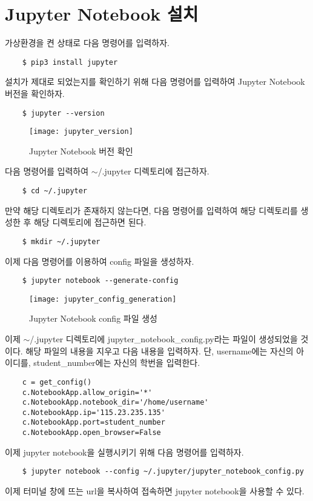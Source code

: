 \section{Jupyter Notebook 설치}
\label{jupyter}
가상환경을 켠 상태로 다음 명령어를 입력하자.
\begin{lstlisting}
    $ pip3 install jupyter
\end{lstlisting}
설치가 제대로 되었는지를 확인하기 위해 다음 명령어를 입력하여 Jupyter Notebook 버전을 확인하자.
\begin{lstlisting}
    $ jupyter --version
\end{lstlisting}

\begin{figure}[H]
	\begin{center}
        \texttt{[image: jupyter\_version]}
        \caption{Jupyter Notebook 버전 확인}
    \end{center}
\end{figure}

다음 명령어를 입력하여 $\sim$/.jupyter 디렉토리에 접근하자.
\begin{lstlisting}
    $ cd ~/.jupyter
\end{lstlisting}
만약 해당 디렉토리가 존재하지 않는다면, 다음 명령어를 입력하여 해당 디렉토리를 생성한 후 해당 디렉토리에 접근하면 된다.
\begin{lstlisting}
    $ mkdir ~/.jupyter
\end{lstlisting}
이제 다음 명령어를 이용하여 config 파일을 생성하자.
\begin{lstlisting}
    $ jupyter notebook --generate-config
\end{lstlisting}

\begin{figure}[H]
	\begin{center}
        \texttt{[image: jupyter\_config\_generation]}
        \caption{Jupyter Notebook config 파일 생성}
    \end{center}
\end{figure}

이제 $\sim$/.jupyter 디렉토리에 jupyter\_notebook\_config.py라는 파일이 생성되었을 것이다. 해당 파일의 내용을 지우고 다음 내용을 입력하자. 단, username에는 자신의 아이디를, student\_number에는 자신의 학번을 입력한다.
\begin{lstlisting}
    c = get_config()
    c.NotebookApp.allow_origin='*'
    c.NotebookApp.notebook_dir='/home/username'
    c.NotebookApp.ip='115.23.235.135'
    c.NotebookApp.port=student_number
    c.NotebookApp.open_browser=False
\end{lstlisting}
이제 jupyter notebook을 실행시키기 위해 다음 명령어를 입력하자.
\begin{lstlisting}
    $ jupyter notebook --config ~/.jupyter/jupyter_notebook_config.py
\end{lstlisting}
이제 터미널 창에 뜨는 url을 복사하여 접속하면 jupyter notebook을 사용할 수 있다.\\

